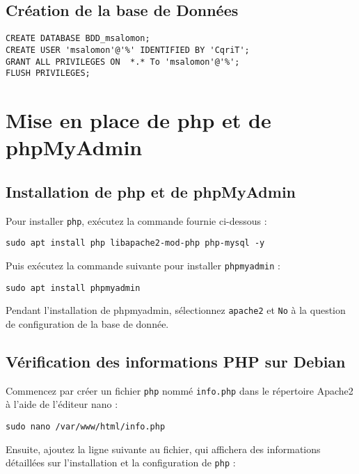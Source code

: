\subsection{Création de la base de Données}

\begin{lstlisting}
CREATE DATABASE BDD_msalomon;
CREATE USER 'msalomon'@'%' IDENTIFIED BY 'CqriT';
GRANT ALL PRIVILEGES ON  *.* To 'msalomon'@'%';
FLUSH PRIVILEGES;
\end{lstlisting}

\section{Mise en place de php et de phpMyAdmin}

\subsection{Installation de php et de phpMyAdmin}

Pour installer \texttt{php}, exécutez la commande fournie ci-dessous :

\begin{lstlisting}
sudo apt install php libapache2-mod-php php-mysql -y
\end{lstlisting}

Puis exécutez la commande suivante pour installer \texttt{phpmyadmin} :

\begin{lstlisting}
sudo apt install phpmyadmin
\end{lstlisting}

Pendant l'installation de phpmyadmin, sélectionnez \texttt{apache2} et \texttt{No} à la question de configuration de la base de donnée.

\subsection{Vérification des informations PHP sur Debian}

Commencez par créer un fichier \texttt{php} nommé \texttt{info.php} dans le répertoire Apache2 à l'aide de l'éditeur nano :

\begin{lstlisting}
sudo nano /var/www/html/info.php
\end{lstlisting}

Ensuite, ajoutez la ligne suivante au fichier, qui affichera des informations détaillées sur l'installation et la configuration de \texttt{php} :

